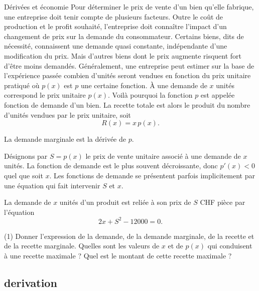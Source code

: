 \documentclass[a4paper,12pt]{article}
\begin{document}
\begin{activite}{Dérivées et économie}
Pour déterminer le prix de vente d’un bien qu’elle fabrique, une entreprise doit tenir compte de plusieurs facteurs. Outre le coût de production et le profit souhaité, l’entreprise doit connaître l’impact d’un changement de prix sur la demande du consommateur. Certains biens, dits de nécessité, connaissent une demande quasi constante, indépendante d’une modification du prix. Mais d’autres biens dont le prix augmente risquent fort d’être moins demandés. Généralement, une entreprise peut estimer sur la base de l’expérience passée combien d’unités seront vendues en fonction du prix unitaire pratiqué où \(p(x)\) est \(p\) une certaine fonction. À une demande de \(x\) unités correspond le prix unitaire \(p(x)\). Voilà pourquoi la fonction \(p\) est appelée fonction de demande d’un bien. La recette totale est alors le produit du nombre d’unités vendues par le prix unitaire, soit 
\[
  R(x)=x\,p(x).
\]

La demande marginale est la dérivée de \(p\).

Désignons par \(S=p(x)\) le prix de vente unitaire associé à une demande de \(x\) unités. La fonction de demande est le plus souvent décroissante, donc \(p'(x)<0\) quel que soit \(x\). Les fonctions de demande se présentent parfois implicitement par une équation qui fait intervenir \(S\) et \(x\).

La demande de \(x\) unités d’un produit est reliée à son prix de \(S\) CHF pièce par l’équation
\[
  2x + S^2 - 12000 = 0.
\]

\begin{tasks}(1)
	\task[h)] Donner l’expression de la demande, de la demande marginale, de la recette et de la recette marginale.
	\task[i)] Quelles sont les valeurs de \(x\) et de \(p(x)\) qui conduisent à une recette maximale ?
	\task[j)]  Quel est le montant de cette recette maximale ?
\end{tasks}
\end{activite}








\subsection{derivation}
\end{document}
